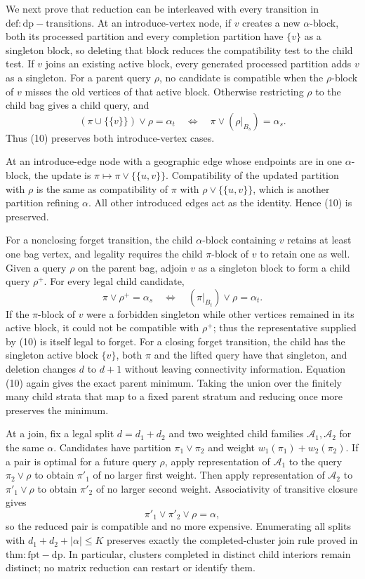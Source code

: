 We next prove that reduction can be interleaved with every transition in \(\mathrm{def:dp-transitions}\).  At an introduce-vertex node, if \(v\) creates a new \(\alpha\)-block, both its processed partition and every completion partition have \(\{v\}\) as a singleton block, so deleting that block reduces the compatibility test to the child test.  If \(v\) joins an existing active block, every generated processed partition adds \(v\) as a singleton.  For a parent query \(\rho\), no candidate is compatible when the \(\rho\)-block of \(v\) misses the old vertices of that active block.  Otherwise restricting \(\rho\) to the child bag gives a child query, and
\[
 (\pi\cup\{\{v\}\})\vee\rho=\alpha_t
 \quad\Longleftrightarrow\quad
 \pi\vee(\rho|_{B_s})=\alpha_s.
\]
Thus (10) preserves both introduce-vertex cases.

At an introduce-edge node with a geographic edge whose endpoints are in one \(\alpha\)-block, the update is \(\pi\mapsto\pi\vee\{\{u,v\}\}\).  Compatibility of the updated partition with \(\rho\) is the same as compatibility of \(\pi\) with \(\rho\vee\{\{u,v\}\}\), which is another partition refining \(\alpha\).  All other introduced edges act as the identity.  Hence (10) is preserved.

For a nonclosing forget transition, the child \(\alpha\)-block containing \(v\) retains at least one bag vertex, and legality requires the child \(\pi\)-block of \(v\) to retain one as well.  Given a query \(\rho\) on the parent bag, adjoin \(v\) as a singleton block to form a child query \(\rho^+\).  For every legal child candidate,
\[
 \pi\vee\rho^+=\alpha_s
 \quad\Longleftrightarrow\quad
 (\pi|_{B_t})\vee\rho=\alpha_t.
\tag{11}
\]
If the \(\pi\)-block of \(v\) were a forbidden singleton while other vertices remained in its active block, it could not be compatible with \(\rho^+\); thus the representative supplied by (10) is itself legal to forget.  For a closing forget transition, the child has the singleton active block \(\{v\}\), both \(\pi\) and the lifted query have that singleton, and deletion changes \(d\) to \(d+1\) without leaving connectivity information.  Equation (10) again gives the exact parent minimum.  Taking the union over the finitely many child strata that map to a fixed parent stratum and reducing once more preserves the minimum.

At a join, fix a legal split \(d=d_1+d_2\) and two weighted child families \(\mathscr A_1,\mathscr A_2\) for the same \(\alpha\).  Candidates have partition \(\pi_1\vee\pi_2\) and weight \(w_1(\pi_1)+w_2(\pi_2)\).  If a pair is optimal for a future query \(\rho\), apply representation of \(\mathscr A_1\) to the query \(\pi_2\vee\rho\) to obtain \(\pi'_1\) of no larger first weight.  Then apply representation of \(\mathscr A_2\) to \(\pi'_1\vee\rho\) to obtain \(\pi'_2\) of no larger second weight.  Associativity of transitive closure gives
\[
 \pi'_1\vee\pi'_2\vee\rho=\alpha,
\]
so the reduced pair is compatible and no more expensive.  Enumerating all splits with \(d_1+d_2+|\alpha|\le K\) preserves exactly the completed-cluster join rule proved in \(\mathrm{thm:fpt-dp}\).  In particular, clusters completed in distinct child interiors remain distinct; no matrix reduction can restart or identify them.


